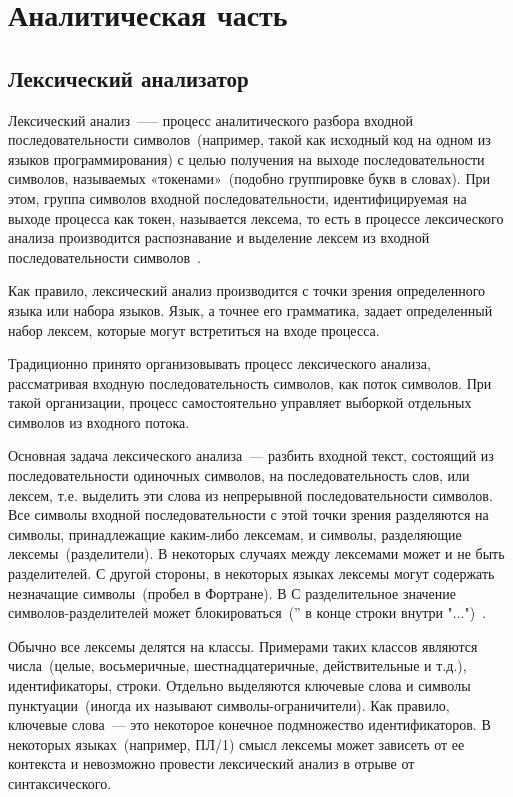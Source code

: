 
\section{Аналитическая часть}
\label{sec:theory}

\subsection{Лексический анализатор}
\label{sec:lexic}

Лексический анализ~--— процесс аналитического разбора входной
последовательности символов~(например, такой как исходный код на одном
из языков программирования) с целью получения на выходе
последовательности символов, называемых «токенами»~(подобно
группировке букв в словах).  При этом, группа символов входной
последовательности, идентифицируемая на выходе процесса как токен,
называется лексема, то есть в процессе лексического анализа
производится распознавание и выделение лексем из входной
последовательности символов~\cite{lex_wiki}.

Как правило, лексический анализ производится с точки зрения
определенного языка или набора языков.  Язык, а точнее его грамматика,
задает определенный набор лексем, которые могут встретиться на входе
процесса.

Традиционно принято организовывать процесс лексического анализа,
рассматривая входную последовательность символов, как поток символов.
При такой организации, процесс самостоятельно управляет выборкой
отдельных символов из входного потока.

Основная задача лексического анализа~--- разбить входной текст,
состоящий из последовательности одиночных символов, на
последовательность слов, или лексем, т.е. выделить эти слова из
непрерывной последовательности символов.  Все символы входной
последовательности с этой точки зрения разделяются на символы,
принадлежащие каким-либо лексемам, и символы, разделяющие
лексемы~(разделители).  В некоторых случаях между лексемами может и не
быть разделителей.  С другой стороны, в некоторых языках лексемы могут
содержать незначащие символы~(пробел в Фортране).  В С разделительное
значение символов-разделителей может блокироваться~('' в конце строки
внутри "...")~\cite{lex}.

Обычно все лексемы делятся на классы.  Примерами таких классов
являются числа~(целые, восьмеричные, шестнадцатеричные, действительные
и т.д.), идентификаторы, строки.  Отдельно выделяются ключевые слова и
символы пунктуации~(иногда их называют символы-ограничители).  Как
правило, ключевые слова~--- это некоторое конечное подмножество
идентификаторов.  В некоторых языках~(например, ПЛ/1) смысл лексемы
может зависеть от ее контекста и невозможно провести лексический
анализ в отрыве от синтаксического.

